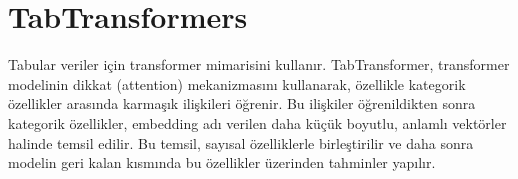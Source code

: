 \section{TabTransformers}

Tabular veriler için transformer mimarisini kullanır. TabTransformer, transformer modelinin dikkat (attention) mekanizmasını kullanarak, özellikle kategorik özellikler arasında karmaşık ilişkileri öğrenir. Bu ilişkiler öğrenildikten sonra kategorik özellikler, embedding adı verilen daha küçük boyutlu, anlamlı vektörler halinde temsil edilir. Bu temsil, sayısal özelliklerle birleştirilir ve daha sonra modelin geri kalan kısmında bu özellikler üzerinden tahminler yapılır.

\newpage